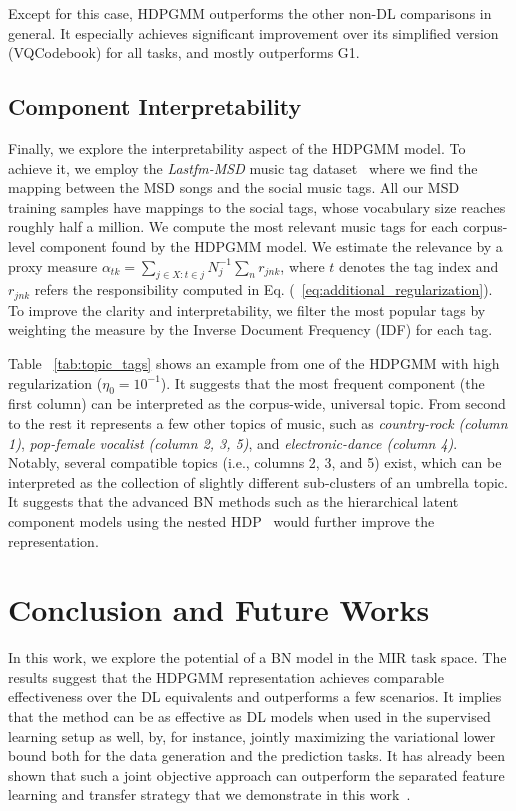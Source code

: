 \documentclass{article}
\begin{document}
Except for this case, HDPGMM outperforms the other non-DL comparisons in general. It especially achieves significant improvement over its simplified version (VQCodebook) for all tasks, and mostly outperforms G1.


\subsection{Component Interpretability}\label{sec:result_discussion:interpretability}

Finally, we explore the interpretability aspect of the HDPGMM model. To achieve it, we employ the \emph{Lastfm-MSD} music tag dataset~\cite{Bertin-Mahieux2011} where we find the mapping between the MSD songs and the social music tags. All our MSD training samples have mappings to the social tags, whose vocabulary size reaches roughly half a million. We compute the most relevant music tags for each corpus-level component found by the HDPGMM model. We estimate the relevance by a proxy measure $\alpha_{tk} = \sum_{j\in{X}:t\in{j}}N_{j}^{-1}\sum_{n}r_{jnk}$, where $t$ denotes the tag index and $r_{jnk}$ refers the responsibility computed in Eq. (~\ref{eq:additional_regularization}). To improve the clarity and interpretability, we filter the most popular tags by weighting the measure by the Inverse Document Frequency (IDF) for each tag.

Table ~\ref{tab:topic_tags} shows an example from one of the HDPGMM with high regularization ($\eta_{0}=10^{-1}$). It suggests that the most frequent component (the first column) can be interpreted as the corpus-wide, universal topic. From second to the rest it represents a few other topics of music, such as \emph{country-rock (column 1)}, \emph{pop-female vocalist (column 2, 3, 5)}, and \emph{electronic-dance (column 4)}. Notably, several compatible topics (i.e., columns 2, 3, and 5) exist, which can be interpreted as the collection of slightly different sub-clusters of an umbrella topic. It suggests that the advanced BN methods such as the hierarchical latent component models using the nested HDP~\cite{DBLP:journals/pami/PaisleyWBJ15} would further improve the representation.


\section{Conclusion and Future Works}\label{sec:conclusion}

In this work, we explore the potential of a BN model in the MIR task space. The results suggest that the HDPGMM representation achieves comparable effectiveness over the DL equivalents and outperforms a few scenarios. It implies that the method can be as effective as DL models when used in the supervised learning setup as well, by, for instance, jointly maximizing the variational lower bound both for the data generation and the prediction tasks. It has already been shown that such a joint objective approach can outperform the separated feature learning and transfer strategy that we demonstrate in this work~\cite{DBLP:journals/taffco/WangLCCH15}.
\end{document}
